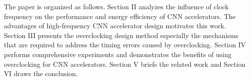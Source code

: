 The paper is organized as follows. Section II analyzes the influence of 
clock frequency on the performance and energy efficiency of CNN accelerators.
The advantages of high-frequency CNN accelerator design motivates this work. 
Section III presents the overclocking design method especially the mechanisms 
that are required to address the timing errors caused by overclocking. 
Section IV performs comprehensive experiments and demonstrates the benefits 
of using overclocking for CNN accelerators. Section V briefs the related work 
and Section VI draws the conclusion. 


